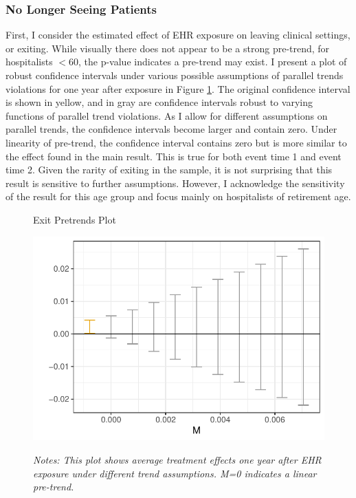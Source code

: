 \documentclass[12pt]{article}
\begin{document}
\subsubsection{No Longer Seeing Patients} 

First, I consider the estimated effect of EHR exposure on leaving clinical settings, or exiting. While visually there does not appear to be a strong pre-trend, for hospitalists $< 60$, the p-value indicates a pre-trend may exist. I present a plot of robust confidence intervals under various possible assumptions of parallel trends violations for one year after exposure in Figure \ref{fig:pre_retire}. The original confidence interval is shown in yellow, and in gray are confidence intervals robust to varying functions of parallel trend violations. As I allow for different assumptions on parallel trends, the confidence intervals become larger and contain zero. Under linearity of pre-trend, the confidence interval contains zero but is more similar to the effect found in the main result. This is true for both event time 1 and event time 2. Given the rarity of exiting in the sample, it is not surprising that this result is sensitive to further assumptions. However, I acknowledge the sensitivity of the result for this age group and focus mainly on hospitalists of retirement age. 

\begin{figure}[ht]
    \centering
    \captionsetup{width=.5\linewidth}
    \caption{Exit Pretrends Plot}
    \includegraphics[scale=.5]{Objects/retire_pretrends_plot.pdf}
    \label{fig:pre_retire}
    \vspace{2mm}
    \caption*{\footnotesize{\textit{Notes: This plot shows average treatment effects one year after EHR exposure under different trend assumptions. M=0 indicates a linear pre-trend.}}}
\end{figure}
\end{document}
